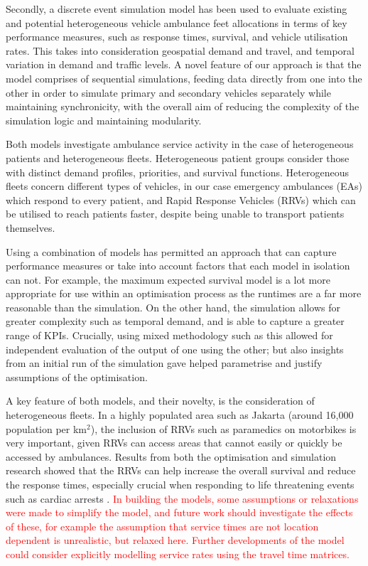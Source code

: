 \documentclass[numbers,webpdf,imaman]{ima-authoring-template}%
\begin{document}
Secondly, a discrete event simulation model has been used to evaluate existing
and potential heterogeneous vehicle ambulance feet allocations in terms of key
performance measures, such as response times, survival, and vehicle utilisation
rates. This takes into consideration geospatial demand and travel, and temporal
variation in demand and traffic levels. A novel feature of our approach is that
the model comprises of sequential simulations, feeding data directly from one
into the other in order to simulate primary and secondary vehicles separately
while maintaining synchronicity, with the overall aim of reducing the complexity
of the simulation logic and maintaining modularity.

Both models investigate ambulance service activity in the case of heterogeneous
patients and heterogeneous fleets. Heterogeneous patient groups consider those
with distinct demand profiles, priorities, and survival functions. Heterogeneous
fleets concern different types of vehicles, in our case emergency ambulances
(EAs) which respond to every patient, and Rapid Response Vehicles (RRVs) which
can be utilised to reach patients faster, despite being unable to transport
patients themselves.

Using a combination of models has permitted an approach that can capture
performance measures or take into account factors that each model in isolation
can not. For example, the maximum expected survival model is a lot more
appropriate for use within an optimisation process as the runtimes are a far
more reasonable than the simulation. On the other hand, the simulation allows
for greater complexity such as temporal demand, and is able to capture a
greater range of KPIs. Crucially, using mixed methodology such as this allowed
for independent evaluation of the output of one using the other; but also
insights from an initial run of the simulation gave helped parametrise and
justify assumptions of the optimisation.

A key feature of both models, and their novelty, is the consideration of
heterogeneous fleets. In a highly populated area such as Jakarta (around
16,000 population per km$^2$), the inclusion of RRVs such as paramedics on
motorbikes is very important, given RRVs can access areas that cannot easily
or quickly be accessed by ambulances. Results from both the optimisation and
simulation research showed that the RRVs can help increase the overall
survival and reduce the response times, especially crucial when responding to
life threatening events such as cardiac arrests \citep{holmen2020shortening}.
\textcolor{red}{In building the models, some assumptions or relaxations were
made to simplify the model, and future work should investigate the effects of
these, for example the assumption that service times are not location dependent
is unrealistic, but relaxed here. Further developments of the model could
consider explicitly modelling service rates using the travel time matrices.}
\end{document}
